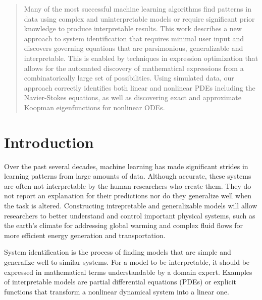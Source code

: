 \documentclass{article}
\begin{document}
\begin{abstract}
Many of the most successful machine learning algorithms  find patterns in data using complex and uninterpretable models or require significant prior knowledge to produce interpretable results. This work describes a new approach to system identification that requires minimal user input and discovers governing equations that are parsimonious, generalizable and interpretable. This is enabled by techniques in expression optimization that allows for the automated discovery of mathematical expressions from a combinatorically large set of possibilities. Using simulated data, our approach correctly identifies both linear and nonlinear PDEs including the Navier-Stokes equations, as well as discovering exact and approximate Koopman eigenfunctions for nonlinear ODEs. 
\end{abstract}

\section{Introduction}
\label{introduction}

Over the past several decades, machine learning has made significant strides in learning patterns from large amounts of data. Although accurate, these systems are often not interpretable by the human researchers who create them. They do not report an explanation for their predictions nor do they generalize well when the task is altered. Constructing intrepretable and generalizable models will allow researchers to better understand and control important physical systems, such as the earth's climate for addressing global warming and complex fluid flows for more efficient energy generation and transportation.


System identification is the process of finding models that are simple and generalize well to similar systems. For a model to be interpretable, it should be expressed in mathematical terms understandable by a domain expert. Examples of interpretable models are partial differential equations (PDEs) or explicit functions that transform a nonlinear dynamical system into a linear one. 
\end{document}
